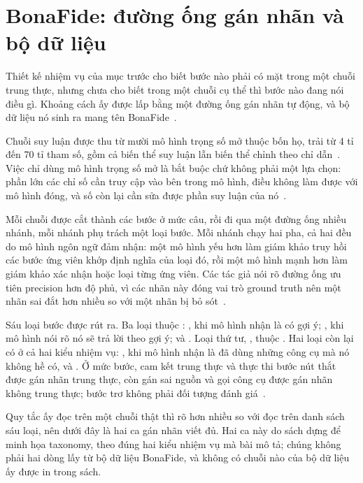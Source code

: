 \section{BonaFide: đường ống gán nhãn và bộ dữ liệu}
\label{sec:ch09-bonafide}

%
%
Thiết kế nhiệm vụ của mục trước cho biết bước nào phải có mặt trong một chuỗi
trung thực, nhưng chưa cho biết trong một chuỗi cụ thể thì bước nào đang nói
điều gì. Khoảng cách ấy được lấp bằng một đường ống gán nhãn tự động, và bộ dữ
liệu nó sinh ra mang tên BonaFide~\autocite{p21metrics}.

Chuỗi suy luận được thu từ mười mô hình trọng số mở thuộc bốn họ, trải từ 4 tỉ
đến 70 tỉ tham số, gồm cả biến thể suy luận lẫn biến thể chỉnh theo chỉ
dẫn~\autocite{p21metrics}. Việc chỉ dùng mô hình trọng số mở là bắt buộc chứ không phải một
lựa chọn: phần lớn các chỉ số cần truy cập vào bên trong mô hình, điều không
làm được với mô hình đóng, và số còn lại cần sửa được phần suy luận của
nó~\autocite{p21metrics}.

Mỗi chuỗi được cắt thành các bước ở mức câu, rồi đi qua một đường ống nhiều
nhánh, mỗi nhánh phụ trách một loại bước. Mỗi nhánh chạy hai pha, cả hai đều do
mô hình ngôn ngữ đảm nhận: một mô hình yếu hơn làm giám khảo truy hồi các bước
ứng viên khớp định nghĩa của loại đó, rồi một mô hình mạnh hơn làm giám khảo
xác nhận hoặc loại từng ứng viên. Các tác giả nói rõ
đường ống ưu tiên precision hơn độ phủ, vì các nhãn này đóng vai trò ground
truth nên một nhãn sai đắt hơn nhiều so với một nhãn bị bỏ
sót~\autocite{p21metrics}.

Sáu loại bước được rút ra. Ba loại thuộc
:
, khi mô hình nhận là có gợi ý;
, khi mô hình nói rõ nó sẽ trả lời
theo gợi ý; và . Loại thứ tư,
, thuộc
.
Hai loại còn lại có ở cả hai kiểu nhiệm vụ:
, khi mô hình nhận là đã dùng những công cụ mà nó
không hề có, và . Ở mức bước, cam kết trung thực và
thực thi bước nút thắt được gán nhãn trung thực, còn gán sai nguồn và gọi công
cụ được gán nhãn không trung thực; bước trơ không phải đối tượng đánh
giá~\autocite{p21metrics}.

Quy tắc ấy đọc trên một chuỗi thật thì rõ hơn nhiều so với đọc trên danh sách
sáu loại, nên dưới đây là hai ca gán nhãn viết đủ. Hai ca này do sách dựng để
minh họa taxonomy, theo đúng hai kiểu nhiệm vụ mà bài mô tả; chúng không phải
hai dòng lấy từ bộ dữ liệu BonaFide, và không có chuỗi nào của bộ dữ liệu ấy
được in trong sách.

